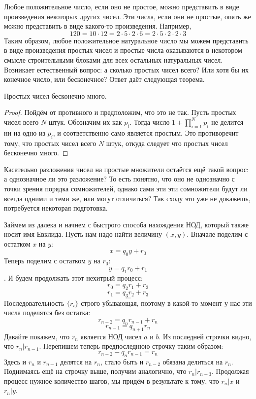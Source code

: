 Любое положительное число, если оно не простое, можно представить в виде произведения некоторых других чисел. Эти числа, если они не простые, опять же можно представить в виде какого-то произведения. Например,
$$120 = 10 \cdot 12 = 2\cdot 5 \cdot 2 \cdot 6 = 2\cdot 5 \cdot 2 \cdot 2 \cdot 3$$
Таким образом, любое положительное натуральное число мы можем представить в виде произведения простых чисел и простые числа оказываются в некотором смысле строительными блоками для всех остальных натуральных чисел. Возникает естественный вопрос: а сколько простых чисел всего? Или хотя бы их конечное число, или бесконечное? Ответ даёт следующая теорема.

\begin{Euclids}
Простых чисел бесконечно много.
\end{Euclids}
\begin{proof}
Пойдём от противного и предположим, что это не так. Пусть простых чисел всего $N$ штук. Обозначим их как ${p_i}$. Тогда число $1 + \prod_{i=1}^N p_i$ не делится ни на одно из $p_i$, и соответственно само является простым. Это противоречит тому, что простых чисел всего $N$ штук, откуда следует что простых чисел бесконечно много.
\end{proof}

Касательно разложения чисел на простые множители остаётся ещё такой вопрос: а однозначное ли это разложение? То есть понятно, что оно не однозначно с точки зрения порядка сомножителей, однако сами эти эти сомножители будут ли всегда одними и теми же, или могут отличаться? Так сходу это уже не докажешь, потребуется некоторая подготовка.

Займем из далека и начнем с быстрого способа нахождения НОД, который также носит имя Евклида. Пусть нам надо найти величину $(x, y)$. Вначале поделим с остатком $x$ на $y$:
$$x = q_0 y + r_0$$
Теперь поделим с остатком $y$ на $r_0$:
$$y = q_1 r_0 + r_1$$.
И будем продолжать этот нехитрый процесс:
$$r_0 = q_2 r_1 + r_2$$
$$r_1 = q_3 r_2 + r_3$$
$$\dots$$
Последовательность $\{r_i\}$ строго убывающая, поэтому в какой-то момент у нас эти числа поделятся без остатка:
$$r_{n-2} = q_n r_{n-1} + r_n$$
$$r_{n-1} = q_{n+1} r_n$$
Давайте покажем, что $r_n$ является НОД чисел $a$ и $b$. Из последней строчки видно, что $r_n | r_{n-1}$. Перепишем теперь предпоследнюю строчку таким образом:
$$r_{n - 2} - q_n r_{n - 1} = r_n$$
Здесь и $r_n$ и $r_{n-1}$ делятся на $r_n$, стало быть и $r_{n-2}$ обязана делиться на $r_n$. Поднимаясь ещё на строчку выше, получим аналогично, что $r_n|r_{n-3}$. Продолжая процесс нужное количество шагов, мы придём в результате к тому, что $r_n|x$ и $r_n|y$.

